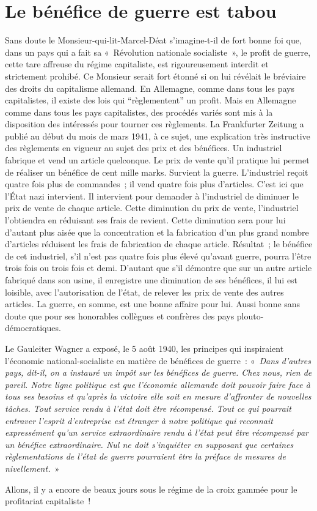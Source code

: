 \documentclass[french,twoside]{book} %
\begin{document}
\section[Le bénéfice de guerre est tabou]{Le bénéfice de guerre est tabou}
\noindent Sans doute le Monsieur-qui-lit-Marcel-Déat s’imagine-t-il de fort bonne foi que, dans un pays qui a fait sa « Révolution nationale socialiste », le profit de guerre, cette tare affreuse du régime capitaliste, est rigoureusement interdit et strictement prohibé. Ce Monsieur serait fort étonné si on lui révélait le bréviaire des droits du capitalisme allemand. En Allemagne, comme dans tous les pays capitalistes, il existe des lois qui “règlementent” un profit. Mais en Allemagne comme dans tous les pays capitalistes, des procédés variés sont mis à la disposition des intéressés pour tourner ces règlements. La Frankfurter Zeitung a publié au début du mois de mars 1941, à ce sujet, une explication très instructive des règlements en vigueur au sujet des prix et des bénéfices. Un industriel fabrique et vend un article quelconque. Le prix de vente qu’il pratique lui permet de réaliser un bénéfice de cent mille marks. Survient la guerre. L’industriel reçoit quatre fois plus de commandes ; il vend quatre fois plus d’articles. C’est ici que l’État nazi intervient. Il intervient pour demander à l’industriel de diminuer le prix de vente de chaque article. Cette diminution du prix de vente, l’industriel l’obtiendra en réduisant ses frais de revient. Cette diminution sera pour lui d’autant plus aisée que la concentration et la fabrication d’un plus grand nombre d’articles réduisent les frais de fabrication de chaque article. Résultat ; le bénéfice de cet industriel, s’il n’est pas quatre fois plus élevé qu’avant guerre, pourra l’être trois fois ou trois fois et demi. D’autant que s’il démontre que sur un autre article fabriqué dans son usine, il enregistre une diminution de ses bénéfices, il lui est loisible, avec l’autorisation de l’état, de relever les prix de vente des autres articles. La guerre, en somme, est une bonne affaire pour lui. Aussi bonne sans doute que pour ses honorables collègues et confrères des pays plouto-démocratiques.\par
Le Gauleiter Wagner a exposé, le 5 août 1940, les principes qui inspiraient l’économie national-socialiste en matière de bénéfices de guerre : « \emph{Dans d’autres pays, dit-il, on a instauré un impôt sur les bénéfices de guerre. Chez nous, rien de pareil. Notre ligne politique est que l’économie allemande doit pouvoir faire face à tous ses besoins et qu’après la victoire elle soit en mesure d’affronter de nouvelles tâches. Tout service rendu à l’état doit être récompensé. Tout ce qui pourrait entraver l’esprit d’entreprise est étranger à notre politique qui reconnait expressément qu’un service extraordinaire rendu à l’état peut être récompensé par un bénéfice extraordinaire. Nul ne doit s’inquiéter en supposant que certaines règlementations de l’état de guerre pourraient être la préface de mesures de nivellement.} »\par
Allons, il y a encore de beaux jours sous le régime de la croix gammée pour le profitariat capitaliste !
\end{document}
